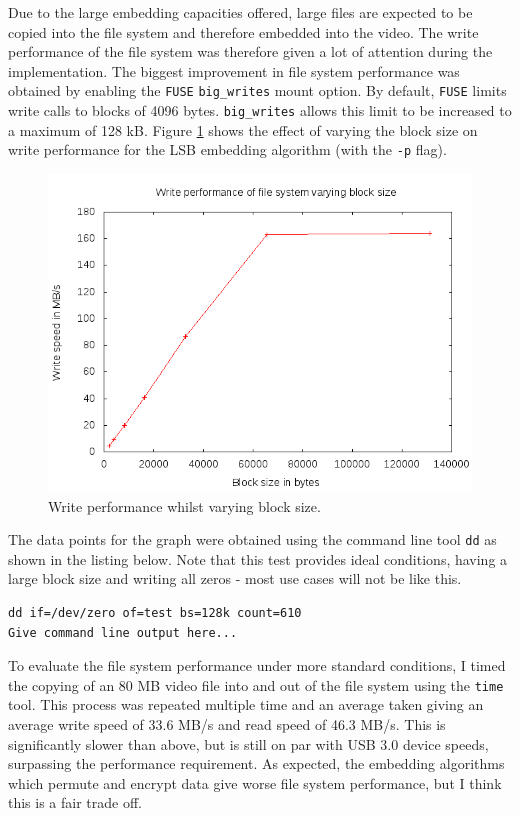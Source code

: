 \documentclass[paper=a4, fontsize=11pt,twoside]{scrartcl}    %
\numberwithin{table}{section}
\numberwithin{figure}{section}
\numberwithin{algorithm}{section}
\begin{document}
Due to the large embedding capacities offered, large files are expected to be copied into the file system and therefore embedded into the video. The write performance of the file system was therefore given a lot of attention during the implementation. The biggest improvement in file system performance was obtained by enabling the \texttt{FUSE} \texttt{big\_writes} mount option. By default, \texttt{FUSE} limits write calls to blocks of 4096 bytes. \texttt{big\_writes} allows this limit to be increased to a maximum of 128 kB. Figure \ref{writeper} shows the effect of varying the block size on write performance for the LSB embedding algorithm (with the \texttt{-p} flag).

\begin{figure}[!h]
\centerline{\includegraphics[width=\textwidth]{images/writeper.png}}
\caption{Write performance whilst varying block size.}
\label{writeper}
\end{figure}

The data points for the graph were obtained using the command line tool \texttt{dd} as shown in the listing below. Note that this test provides ideal conditions, having a large block size and writing all zeros - most use cases will not be like this.

\begin{lstlisting}[caption={Testing the file system performance using \texttt{dd}.}, frame=single, label=dd]
dd if=/dev/zero of=test bs=128k count=610
Give command line output here...
\end{lstlisting}

To evaluate the file system performance under more standard conditions, I timed the copying of an 80 MB video file into and out of the file system using the \texttt{time} tool. This process was repeated multiple time and an average taken giving an average write speed of 33.6 MB/s and read speed of 46.3 MB/s. This is significantly slower than above, but is still on par with USB 3.0 device speeds, surpassing the performance requirement. As expected, the embedding algorithms which permute and encrypt data give worse file system performance, but I think this is a fair trade off.
\end{document}
